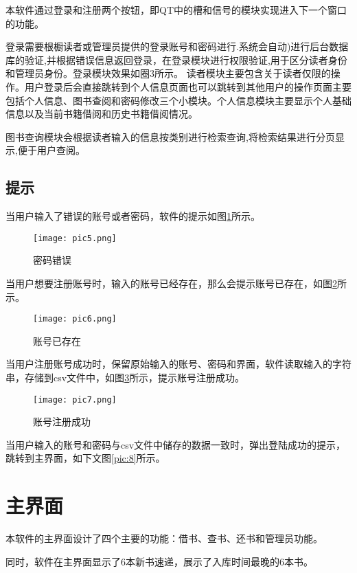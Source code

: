 \documentclass[forprint]{shmtu}
\begin{document}
本软件通过登录和注册两个按钮，即QT中的槽和信号的模块实现进入下一个窗口的功能。

登录需要根橱读者或管理员提供的登录账号和密码进行.系统会自动)进行后台数据库的验证,并根据错误信息返回登录，在登录模块进行权限验证,用于区分读者身份和管理员身份。登录模块效果如圈3所示。
读者模块主要包含关于读者仅限的操作。用户登录后会直接跳转到个人信息页面也可以跳转到其他用户的操作页面主要包括个人信息、图书查阅和密码修改三个小模块。个人信息模块主要显示个人基础信息以及当前书籍借阅和历史书籍借阅情况。

图书查询模块会根据读者输入的信息按类别进行检索查询,将检索结果进行分页显示,便于用户查阅。

\subsection{提示}

当用户输入了错误的账号或者密码，软件的提示如图\ref{pic:5}所示。

\begin{figure}[!htbp]
	\centering
	\texttt{[image: pic5.png]}
	\caption{密码错误}
	\label{pic:5}
\end{figure}

当用户想要注册账号时，输入的账号已经存在，那么会提示账号已存在，如图\ref{pic:6}所示。

\begin{figure}[!htbp]
	\centering
	\texttt{[image: pic6.png]}
	\caption{账号已存在}
	\label{pic:6}
\end{figure}

当用户注册账号成功时，保留原始输入的账号、密码和界面，软件读取输入的字符串，存储到csv文件中，如图\ref{pic:7}所示，提示账号注册成功。

\begin{figure}[!htbp]
	\centering
	\texttt{[image: pic7.png]}
	\caption{账号注册成功}
	\label{pic:7}
\end{figure}

当用户输入的账号和密码与csv文件中储存的数据一致时，弹出登陆成功的提示，跳转到主界面，如下文图\ref{pic:8}所示。

\section{主界面}

本软件的主界面设计了四个主要的功能：借书、查书、还书和管理员功能。

同时，软件在主界面显示了6本新书速递，展示了入库时间最晚的6本书。
\end{document}
